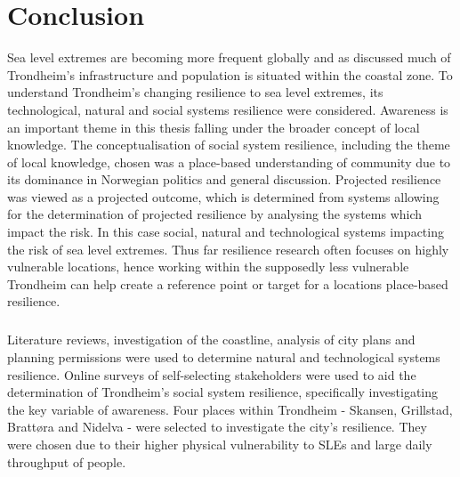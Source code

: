 


\chapter{Conclusion}

Sea level extremes are becoming more frequent globally and as discussed much of Trondheim's infrastructure and population is situated within the coastal zone. To understand Trondheim's changing resilience to sea level extremes, its technological, natural and social systems resilience were considered. Awareness is an important theme in this thesis falling under the broader concept of local knowledge. The conceptualisation of social system resilience, including the theme of local knowledge, chosen was a place-based understanding of community due to its dominance in Norwegian politics and general discussion. Projected resilience was viewed as a projected outcome, which is determined from systems allowing for the determination of projected resilience by analysing the systems which impact the risk. In this case social, natural and technological systems impacting the risk of sea level extremes. Thus far resilience research often focuses on highly vulnerable locations, hence working within the supposedly less vulnerable Trondheim can help create a reference point or target for a locations place-based resilience.
\paragraph{}

Literature reviews, investigation of the coastline, analysis of city plans and planning permissions were used to determine natural and technological systems resilience. Online surveys of self-selecting stakeholders were used to aid the determination of Trondheim's social system resilience, specifically investigating the key variable of awareness. Four places within Trondheim - Skansen, Grillstad, Brattøra and Nidelva - were selected to investigate the city's resilience. They were chosen due to their higher physical vulnerability to SLEs and large daily throughput of people.

